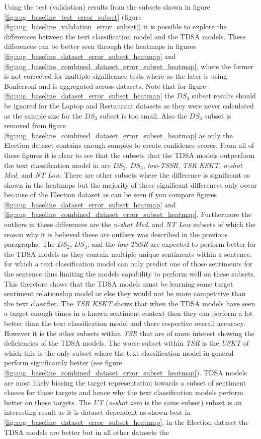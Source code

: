 Using the test (validation) results from the subsets shown in figure \ref{fig:aug_baseline_test_error_subset} (figure \ref{fig:aug_baseline_validation_error_subset}) it is possible to explore the differences between the text classification model and the TDSA models. These differences can be better seen through the heatmaps in figures \ref{fig:aug_baseline_dataset_error_subset_heatmap} and \ref{fig:aug_baseline_combined_dataset_error_subset_heatmap}, where the former is not corrected for multiple significance tests where as the later is using Bonferroni and is aggregated across datasets. Note that for figure \ref{fig:aug_baseline_dataset_error_subset_heatmap} the $DS_3$ subset results should be ignored for the Laptop and Restaurant datasets as they were never calculated as the sample size for the $DS_3$ subset is too small. Also the $DS_3$ subset is removed from figure \ref{fig:aug_baseline_combined_dataset_error_subset_heatmap} as only the Election dataset contains enough samples to create confidence scores. From all of these figures it is clear to see that the subsets that the TDSA models outperform the text classification model in are $DS_2$, $DS_3$, \textit{low-TSSR}, \textit{TSR KSKT}, \textit{n-shot Med}, and \textit{NT Low}. There are other subsets where the difference is significant as shown in the heatmaps but the majority of these significant differences only occur because of the Election dataset as can be seen if you compare figures \ref{fig:aug_baseline_dataset_error_subset_heatmap} and \ref{fig:aug_baseline_combined_dataset_error_subset_heatmap}. Furthermore the outliers in these differences are the \textit{n-shot Med}, and \textit{NT Low} subsets of which the reason why it is believed these are outliers was described in the previous paragraphs. The $DS_2$, $DS_3$, and the \textit{low-TSSR} are expected to perform better for the TDSA models as they contain multiple unique sentiments within a sentence, for which a text classification model can only predict one of those sentiments for the sentence thus limiting the models capability to perform well on these subsets. This therefore shows that the TDSA models must be learning some target sentiment relationship model or else they would not be more competitive than the text classifier. The \textit{TSR KSKT} shows that when the TDSA models have seen a target enough times in a known sentiment context then they can perform a lot better than the text classification model and there respective overall accuracy. However it is the other subsets within \textit{TSR} that are of more interest showing the deficiencies of the TDSA models. The worse subset within \textit{TSR} is the \textit{USKT} of which this is the only subset where the text classification model in general perform significantly better (see figure \ref{fig:aug_baseline_combined_dataset_error_subset_heatmap}). TDSA models are most likely biasing the target representation towards a subset of sentiment classes for those targets and hence why the text classification models perform better on those targets. The \textit{UT} (\textit{n-shot zero} is the same subset) subset is an interesting result as it is dataset dependent as shown best in \ref{fig:aug_baseline_dataset_error_subset_heatmap}, in the Election dataset the TDSA models are better but in all other datasets the 